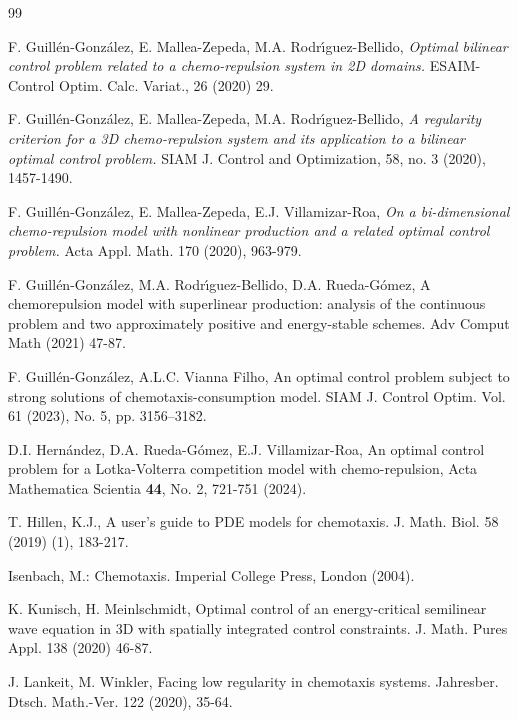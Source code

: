 \documentclass[11pt,reqno]{amsart}%
\numberwithin{equation}{section}
\begin{document}
{\begin{thebibliography}{99}

 F. Guill\'en-Gonz\'alez, E. Mallea-Zepeda, M.A. Rodr\'{\i}guez-Bellido, \emph{Optimal bilinear control problem related to a chemo-repulsion system in 2D domains.} 
ESAIM-Control Optim. Calc. Variat., 26 (2020) 29. 

 F. Guill\'en-Gonz\'alez, E. Mallea-Zepeda, M.A. Rodr\'{\i}guez-Bellido, \emph{A regularity criterion for a 3D chemo-repulsion system and its application to a bilinear optimal control problem.} 
SIAM J. Control and Optimization, 58, no. 3 (2020), 1457-1490. 

  F. Guill\'en-Gonz\'alez, E. Mallea-Zepeda, E.J. Villamizar-Roa, \emph{On a bi-dimensional chemo-repulsion model with nonlinear production and a related optimal control problem.} Acta Appl. Math. 170 (2020), 963-979.

F. Guill\'en-Gonz\'alez, M.A. Rodr\'{\i}guez-Bellido, D.A. Rueda-G\'omez, 
A chemorepulsion model with superlinear production: analysis of the continuous problem and two approximately positive and energy-stable schemes. Adv Comput Math (2021) 47-87.

 F. Guill\'en-Gonz\'alez, A.L.C. Vianna Filho,
An optimal control problem subject to strong solutions of chemotaxis-consumption model.
SIAM J. Control Optim. Vol. 61 (2023), No. 5, pp. 3156--3182.

 { D.I. Hern\'andez, D.A. Rueda-G\'omez, E.J. Villamizar-Roa,} An optimal control problem for a Lotka-Volterra competition model with chemo-repulsion,
Acta Mathematica Scientia \textbf{44}, No. 2, 721-751 (2024).

 T. Hillen, K.J., A user's guide to PDE models for chemotaxis. J. Math. Biol. 58 (2019)
(1), 183-217.

 Isenbach, M.: Chemotaxis. Imperial College Press, London (2004).

 K. Kunisch, H. Meinlschmidt, Optimal control of an energy-critical semilinear wave equation in 3D with spatially integrated control constraints. J. Math. Pures Appl. 138 (2020) 46-87.

 J. Lankeit, M. Winkler, Facing low regularity in chemotaxis systems. Jahresber. Dtsch.
Math.-Ver. 122 (2020), 35-64.


\end{thebibliography}}
\end{document}
